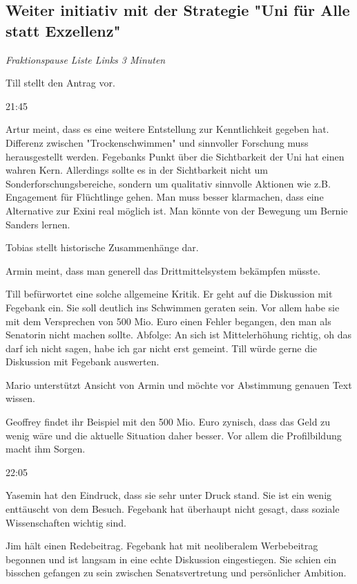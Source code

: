\documentclass[ngerman,headheight=70pt]{scrartcl}
\begin{document}
    \subsection{Weiter initiativ mit der Strategie "Uni für Alle statt Exzellenz"}

    \textit{Fraktionspause Liste Links 3 Minuten}

    Till stellt den Antrag vor.

    21:45

    Artur meint, dass es eine weitere Entstellung zur Kenntlichkeit
    gegeben hat.
    Differenz zwischen "Trockenschwimmen" und sinnvoller Forschung muss
    herausgestellt werden. Fegebanks Punkt über die Sichtbarkeit der Uni hat
    einen wahren Kern. Allerdings sollte es in der Sichtbarkeit nicht um
    Sonderforschungsbereiche, sondern um qualitativ sinnvolle Aktionen wie z.B.
    Engagement für Flüchtlinge gehen.
    Man muss besser klarmachen, dass eine Alternative zur Exini real
    möglich ist. Man könnte von der Bewegung um Bernie Sanders lernen.

    Tobias stellt historische Zusammenhänge dar.

    Armin meint, dass man generell das Drittmittelsystem bekämpfen müsste.

    Till befürwortet eine solche allgemeine Kritik. Er geht auf die Diskussion
    mit Fegebank ein. Sie soll deutlich ins Schwimmen geraten sein. Vor allem
    habe sie mit dem Versprechen von 500 Mio. Euro einen Fehler begangen, den
    man als Senatorin nicht machen sollte. Abfolge:
    An sich ist Mittelerhöhung richtig, oh das darf ich nicht sagen, habe ich
    gar nicht erst gemeint.
    Till würde gerne die Diskussion mit Fegebank auswerten.

    Mario unterstützt Ansicht von Armin und möchte vor Abstimmung genauen
    Text wissen.

    Geoffrey findet ihr Beispiel mit den 500 Mio. Euro zynisch, dass das Geld
    zu wenig wäre und die aktuelle Situation daher besser. Vor allem die Profilbildung
    macht ihm Sorgen.

    22:05

    Yasemin hat den Eindruck, dass sie sehr unter Druck stand. Sie ist ein
    wenig enttäuscht von dem Besuch. Fegebank hat überhaupt nicht
    gesagt, dass soziale Wissenschaften wichtig sind.

    Jim hält einen Redebeitrag. Fegebank hat mit neoliberalem Werbebeitrag
    begonnen und ist langsam in eine echte Diskussion eingestiegen.
    Sie schien ein bisschen gefangen zu sein zwischen Senatsvertretung und
    persönlicher Ambition.
\end{document}
